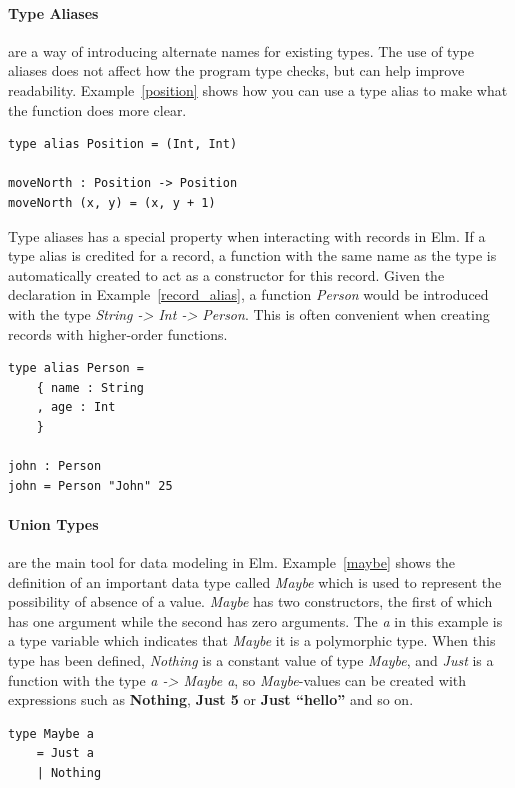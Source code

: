 \documentclass[../thesis.tex]{subfiles}
\begin{document}
\paragraph{Type Aliases} are a way of introducing alternate names for existing types.
The use of type aliases does not affect how the program type checks, but can help improve readability.
Example~\ref{position} shows how you can use a type alias to make what the function does more clear.
\begin{example}\label{position}
\begin{verbatim}
type alias Position = (Int, Int) 

moveNorth : Position -> Position
moveNorth (x, y) = (x, y + 1)
\end{verbatim}
\end{example}
Type aliases has a special property when interacting with records in Elm.
If a type alias is credited for a record, a function with the same name as the type
is automatically created to act as a constructor for this record.
Given the declaration in Example~\ref{record_alias}, a function \textit{Person}
would be introduced with the type \textit{String -> Int -> Person}.
This is often convenient when creating records with higher-order functions.
\begin{example}\label{record_alias}
\begin{verbatim}
type alias Person =
    { name : String
    , age : Int
    }

john : Person
john = Person "John" 25
\end{verbatim}
\end{example}

\paragraph{Union Types} are the main tool for data modeling in Elm.
Example~\ref{maybe} shows the definition of an important data type called \textit{Maybe}
which is used to represent the possibility of absence of a value.
\textit{Maybe} has two constructors, the first of which has one argument while the second has zero arguments.
The \textit{a} in this example is a type variable which indicates that \textit{Maybe} it is a polymorphic type.
When this type has been defined, \textit{Nothing} is a constant value of type \textit{Maybe}, and \textit{Just}
is a function with the type \textit{a -> Maybe a}, so \textit{Maybe}-values can be created
with expressions such as \textbf{Nothing}, \textbf{Just 5} or \textbf{Just ``hello''} and so on.
\begin{example}\label{maybe}
\begin{verbatim}
type Maybe a
    = Just a
    | Nothing
\end{verbatim}
\end{example}
\end{document}

